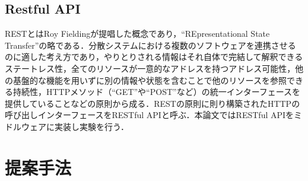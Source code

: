\documentclass[a4paper,11pt]{ujreport}
\begin{document}
\section{Restful API}
RESTとはRoy Fieldingが提唱した概念であり\cite{fielding2000architectural}，“REpresentational State Transfer”の略である．分散システムにおける複数のソフトウェアを連携させるのに適した考え方であり，やりとりされる情報はそれ自体で完結して解釈できるステートレス性，全てのリソースが一意的なアドレスを持つアドレス可能性，他の基盤的な機能を用いずに別の情報や状態を含むことで他のリソースを参照できる持続性，HTTPメソッド（“GET”や“POST”など）の統一インターフェースを提供していることなどの原則から成る．RESTの原則に則り構築されたHTTPの呼び出しインターフェースをRESTful APIと呼ぶ．本論文ではRESTful APIをミドルウェアに実装し実験を行う．

\chapter{提案手法}
\label{chap:ProposedAlgorithm}
\end{document}

